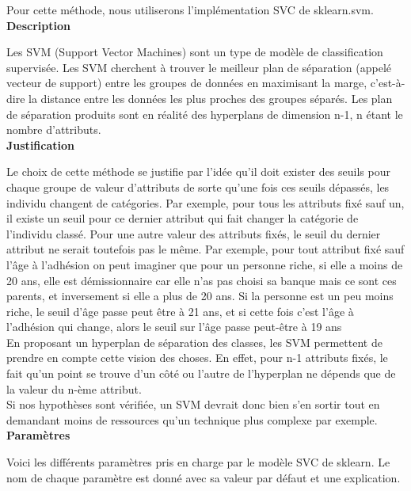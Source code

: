 \documentclass{ceri/sty/rapport}
\begin{document}
Pour cette méthode, nous utiliserons l'implémentation SVC de sklearn.svm.\\

\textbf{Description}

Les SVM (Support Vector Machines) sont un type de modèle de classification supervisée. Les SVM cherchent à trouver le meilleur plan de séparation (appelé vecteur de support) entre les groupes de données en maximisant la marge, c'est-à-dire la distance entre les données les plus proches des groupes séparés. Les plan de séparation produits sont en réalité des hyperplans de dimension n-1, n étant le nombre d'attributs.\\

\textbf{Justification}

Le choix de cette méthode se justifie par l'idée qu'il doit exister des seuils pour chaque groupe de valeur d'attributs de sorte qu'une fois ces seuils dépassés, les individu changent de catégories. Par exemple, pour tous les attributs fixé sauf un, il existe un seuil pour ce dernier attribut qui fait changer la catégorie de l'individu classé. Pour une autre valeur des attributs fixés, le seuil du dernier attribut ne serait toutefois pas le même. Par exemple, pour tout attribut fixé sauf l'âge à l'adhésion on peut imaginer que pour un personne riche, si elle a moins de 20 ans, elle est démissionnaire car elle n'as pas choisi sa banque mais ce sont ces parents, et inversement si elle a plus de 20 ans. Si la personne est un peu moins riche, le seuil d'âge passe peut être à 21 ans, et si cette fois c'est l'âge à l'adhésion qui change, alors le seuil sur l'âge passe peut-être à 19 ans \\
En proposant un hyperplan de séparation des classes, les SVM permettent de prendre en compte cette vision des choses. En effet, pour n-1 attributs fixés, le fait qu'un point se trouve d'un côté ou l'autre de l'hyperplan ne dépends que de la valeur du n-ème attribut.\\
Si nos hypothèses sont vérifiée, un SVM devrait donc bien s'en sortir tout en demandant moins de ressources qu'un technique plus complexe par exemple.\\


\textbf{Paramètres}

Voici les différents paramètres pris en charge par le modèle SVC de sklearn. Le nom de chaque paramètre est donné avec sa valeur par défaut et une explication.\\
\end{document}

